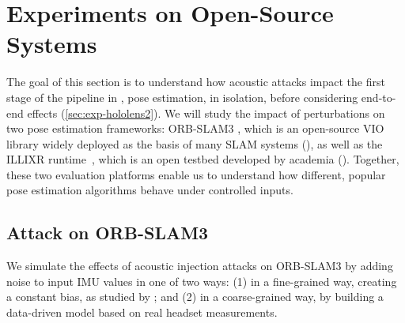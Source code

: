 \section{Experiments on Open-Source Systems}
\label{sec:exp}

The goal of this section is to understand how acoustic attacks impact the first stage of the pipeline in , pose estimation, in isolation, before considering end-to-end effects (\cref{sec:exp-hololens2}).
We will study the impact of perturbations on two  pose estimation frameworks:
ORB-SLAM3 \cite{campos2021orb}, which is an open-source VIO library widely deployed as the basis of many SLAM systems 
(), as well as the ILLIXR runtime~\cite{huzaifa2021illixr}, which is an open testbed developed by academia ().
Together, these two evaluation platforms enable us to understand how different, popular pose estimation algorithms behave under controlled inputs.










\subsection{Attack on ORB-SLAM3}
\label{subsec:exp-orbslam3}
We simulate the effects of acoustic injection attacks on ORB-SLAM3 \cite{campos2021orb}
by adding noise to input IMU values in one of two ways: (1) in a fine-grained way, creating a constant bias, as studied by \cite{trippel2017walnut}; and (2) in a coarse-grained way, by building a data-driven model based on real headset measurements.




